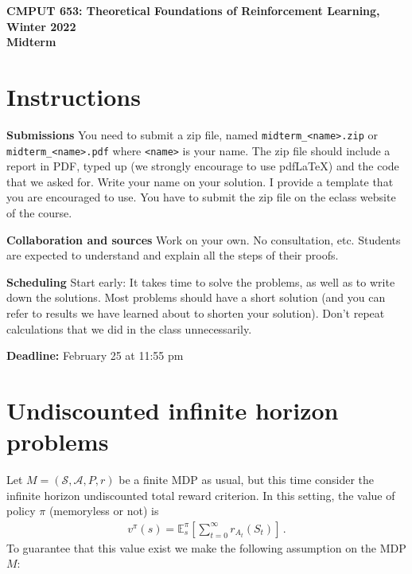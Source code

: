 \documentclass{article}
\DeclareMathOperator*{\1}{\mathbbm{1}}
\newcommand{\E}{\mathbb E}
\theoremstyle{definition}
\theoremstyle{remark}
\newcommand{\cS}{\mathcal{S}}
\newcommand{\cA}{\mathcal{A}}
\begin{document}
\begin{center}
{\Large \textbf{CMPUT 653: Theoretical Foundations of Reinforcement Learning, Winter 2022\\ Midterm}}
\end{center}

\section*{Instructions}
\noindent \textbf{Submissions}
You need to submit a zip file, named {\tt midterm\_<name>.zip} 
or {\tt midterm\_<name>.pdf} 
where {\tt <name>} is your name.
The zip file should include a report in PDF, typed up (we strongly encourage to use pdf\LaTeX) and the code that we asked for. Write your name on your solution.
I provide a template that you are encouraged to use.
You have to submit the zip file on the eclass website of the course.

\noindent \textbf{Collaboration and sources}
Work on your own. No consultation, etc.
Students are expected to understand and explain all the steps of their proofs.

\noindent \textbf{Scheduling}
Start early: It takes time to solve the problems, as well as to write down the solutions. Most problems should have a short solution (and you can refer to results we have learned about to shorten your solution). Don't repeat calculations that we did in the class unnecessarily.

\vspace{0.3cm}

\noindent \textbf{Deadline:} February 25 at 11:55 pm

\newcommand{\cM}{\mathcal{M}}
\newcommand{\nS}{\mathrm{S}}
\newcommand{\nA}{\mathrm{A}}
\newcommand{\PP}{\mathbb{P}}
\newcommand{\RR}{\mathbb{R}}
\newcommand{\ip}[1]{\langle #1 \rangle}

\section*{Undiscounted infinite horizon problems}


Let $M = (\cS,\cA,P,r)$ be a finite MDP as usual, but this time consider the infinite horizon undiscounted total reward criterion. In this setting, the value of policy $\pi$ (memoryless or not) is
\begin{align*}
v^\pi(s) = \E^{\pi}_s\left[ \sum_{t=0}^\infty r_{A_t}(S_t) \right]\,.
\end{align*}
To guarantee that this value exist we make the following assumption on the MDP $M$:
\end{document}
